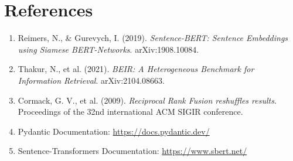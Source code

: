\documentclass[11pt,a4paper]{article}
\begin{document}
\section{References}
\begin{enumerate}
    \item Reimers, N., \& Gurevych, I. (2019). \textit{Sentence-BERT: Sentence Embeddings using Siamese BERT-Networks}. arXiv:1908.10084.
    \item Thakur, N., et al. (2021). \textit{BEIR: A Heterogeneous Benchmark for Information Retrieval}. arXiv:2104.08663.
    \item Cormack, G. V., et al. (2009). \textit{Reciprocal Rank Fusion reshuffles results}. Proceedings of the 32nd international ACM SIGIR conference.
    \item Pydantic Documentation: \url{https://docs.pydantic.dev/}
    \item Sentence-Transformers Documentation: \url{https://www.sbert.net/}
\end{enumerate}
\end{document}
